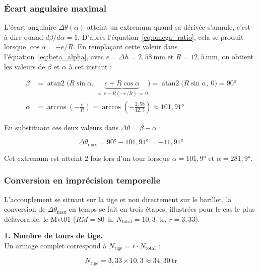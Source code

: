 \subsubsection{Écart angulaire maximal}

L'écart angulaire $\Delta\theta(\alpha)$ atteint un extremum quand sa dérivée
s'annule, c'est-à-dire quand $d\beta/d\alpha=1$. D'après
l'équation~\eqref{eq:omega_ratio}, cela se produit lorsque $\cos\alpha=-e/R$.
En remplaçant cette valeur dans l'équation~\eqref{eq:beta_alpha}, avec
$e=\Delta h=2{,}58\ \text{mm}$ et $R=12{,}5\ \text{mm}$, on obtient les
valeurs de $\beta$ et $\alpha$ à cet instant :

\begin{align}
  \beta &= \operatorname{atan2}\!\Big(R\sin\alpha,\ \underbrace{e+R\cos\alpha}_{=\,e+R(-e/R)\,=\,0}\Big)
  = \operatorname{atan2}\big(R\sin\alpha,\ 0\big) = 90° \\
  \alpha &= \arccos\!\left(-\frac{e}{R}\right) = \arccos\!\left(-\frac{2{,}58}{12{,}5}\right) \approx 101{,}91°
  \label{eq:alpha_extremum}
\end{align}

En substituant ces deux valeurs dans $\Delta\theta=\beta-\alpha$ :

\begin{equation}
  \Delta\theta_{\text{max}} = 90° - 101{,}91° = -11{,}91°
  \label{eq:delta_max}
\end{equation}

Cet extremum est atteint 2 fois lors d'un tour lorsque $\alpha=101{,}9°$ et $\alpha=281{,}9°$.

\subsubsection{Conversion en imprécision temporelle}

L'accouplement se situant sur la tige et non directement sur le barillet, la
conversion de $\Delta\theta_{\text{max}}$ en temps se fait en trois étapes,
illustrées pour le cas le plus défavorable, le Mvt01 ($RM=80$~h,
$N_{\text{total}}=10{,}3$~tr, $r=3{,}33$).

\textbf{1. Nombre de tours de tige.\\} Un armage complet correspond à
$N_{\text{tige}} = r\cdot N_{\text{total}}$ :

\begin{equation}
  N_{\text{tige}} = 3{,}33\times 10{,}3 \approx 34{,}30\ \text{tr}
  \label{eq:n_tige_mvt01}
\end{equation}

